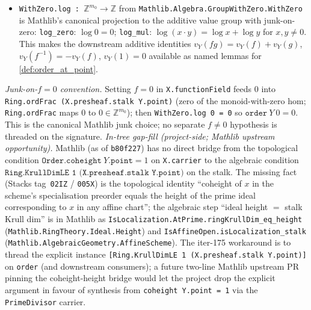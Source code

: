 \begin{definition}
\begin{itemize}
      and from the explicitly threaded
      \texttt{[Ring.KrullDimLE 1 (X.presheaf.stalk Y.point)]}.
    \item \texttt{WithZero.log : \(\mathbb Z^{m_0} \to \mathbb Z\)}
      from \texttt{Mathlib.Algebra.GroupWithZero.WithZero} is Mathlib's
      canonical projection to the additive value group with
      junk-on-zero: \texttt{log\_zero}: \(\log 0 = 0\);
      \texttt{log\_mul}: \(\log(x \cdot y) = \log x + \log y\) for
      \(x, y \neq 0\). This makes the downstream additive identities
      \(v_Y(fg) = v_Y(f) + v_Y(g)\), \(v_Y(f^{-1}) = -v_Y(f)\),
      \(v_Y(1) = 0\) available as named lemmas for
      \ref{def:order_at_point}.
  \end{itemize}
  \emph{Junk-on-\(f = 0\) convention.} Setting \(f = 0\) in
  \texttt{X.functionField} feeds \(0\) into
  \texttt{Ring.ordFrac (X.presheaf.stalk Y.point)} (zero of the
  monoid-with-zero hom; \texttt{Ring.ordFrac} maps \(0\) to
  \(0 \in \mathbb Z^{m_0}\)); then \texttt{WithZero.log 0 = 0} so
  \(\texttt{order}\ Y\ 0 = 0\). This is the canonical Mathlib junk
  choice; no separate \(f \neq 0\) hypothesis is threaded on the
  signature.
  \emph{In-tree gap-fill (project-side; Mathlib upstream opportunity).}
  Mathlib (as of \texttt{b80f227}) has no direct bridge from the
  topological condition \(\texttt{Order.coheight}\ Y.\texttt{point} = 1\)
  on \texttt{X.carrier} to the algebraic condition
  \(\texttt{Ring.KrullDimLE 1 (X.presheaf.stalk Y.point)}\) on the
  stalk. The missing fact (Stacks tag~\texttt{02IZ} / \texttt{005X}) is
  the topological identity ``coheight of \(x\) in the scheme's
  specialisation preorder equals the height of the prime ideal
  corresponding to \(x\) in any affine chart''; the algebraic step
  ``ideal height \(=\) stalk Krull dim'' is in Mathlib as
  \texttt{IsLocalization.AtPrime.ringKrullDim\_eq\_height}
  (\texttt{Mathlib.RingTheory.Ideal.Height}) and
  \texttt{IsAffineOpen.isLocalization\_stalk}
  (\texttt{Mathlib.AlgebraicGeometry.AffineScheme}). The iter-175
  workaround is to thread the explicit instance
  \texttt{[Ring.KrullDimLE 1 (X.presheaf.stalk Y.point)]} on
  \texttt{order} (and downstream consumers); a future two-line
  Mathlib upstream PR pinning the coheight-height bridge would let
  the project drop the explicit argument in favour of synthesis from
  \texttt{coheight Y.point = 1} via the \texttt{PrimeDivisor} carrier.
\end{definition}
